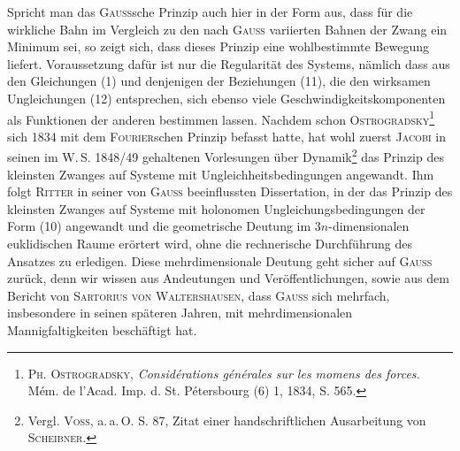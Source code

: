 Spricht man das \textsc{Gauss}sche Prinzip auch hier in der Form aus, dass für die
wirkliche Bahn im Vergleich zu den nach \textsc{Gauss} variierten Bahnen der Zwang
ein Minimum sei, so zeigt sich, dass dieses Prinzip eine wohlbestimmte Bewegung
liefert. Voraussetzung dafür ist nur die Regularität des Systems, nämlich
dass aus den Gleichungen (1) und denjenigen der Beziehungen (11), die
\clearpage{}
\noindent den wirksamen Ungleichungen (12) entsprechen, sich ebenso viele Geschwindigkeitskomponenten
als Funktionen der anderen bestimmen lassen. Nachdem schon
\textsc{Ostrogradsky}\footnote{\textsc{Ph. Ostrogradsky}, \textit{Considérations générales sur les momens des forces.} Mém. de l’Acad. Imp.
d. St. Pétersbourg (6) 1, 1834, S. 565.} sich 1834 mit dem \textsc{Fourier}schen Prinzip befasst hatte, hat
wohl zuerst \textsc{Jacobi} in seinen im W.\,S. 1848/49 gehaltenen Vorlesungen über
Dynamik\footnote{Vergl. \textsc{Voss}, a.\,a.\,O. S. 87, Zitat einer handschriftlichen Ausarbeitung von \textsc{Scheibner}.} das Prinzip des kleinsten Zwanges auf Systeme mit Ungleichheitsbedingungen
angewandt. Ihm folgt \textsc{Ritter} in seiner von \textsc{Gauss} beeinflussten
Dissertation, in der das Prinzip des kleinsten Zwanges auf Systeme mit holonomen
Ungleichungsbedingungen der Form (10) angewandt und die geometrische
Deutung im $3n$-dimensionalen euklidischen Raume erörtert wird, ohne
die rechnerische Durchführung des Ansatzes zu erledigen. Diese mehrdimensionale
Deutung geht sicher auf \textsc{Gauss} zurück, denn wir wissen aus Andeutungen
und Veröffentlichungen, sowie aus dem Bericht von \textsc{Sartorius von
Waltershausen}, dass \textsc{Gauss} sich mehrfach, insbesondere in seinen späteren
Jahren, mit mehrdimensionalen Mannigfaltigkeiten beschäftigt hat.

